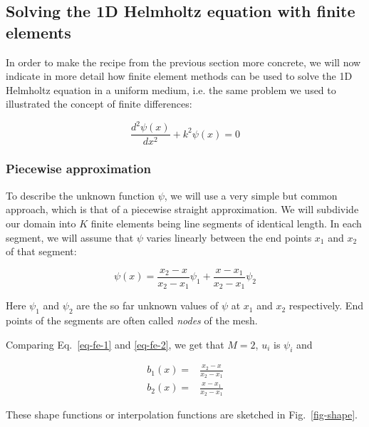 \subsection{Solving the 1D Helmholtz equation with finite elements}

In order to make the recipe from the previous section more concrete, we will now indicate in more detail how finite element methods can be used to solve the 1D Helmholtz equation in a uniform medium, i.e. the same problem we used to illustrated the concept of finite differences:

\begin{equation}
\frac{d^2 \psi (x)}{d x^2} + k^2 \psi(x) = 0 \label{eq-helmholtz-1d-2}
\end{equation} 

\subsubsection{Piecewise approximation}

To describe the unknown function $\psi$, we will use a very simple but common approach, which is that of a piecewise straight approximation. We will subdivide our domain into $K$ finite elements being line segments of identical length. In each segment, we will assume that $\psi$ varies linearly between the end points $x_1$ and $x_2$ of that segment:

\begin{equation}
\psi(x) = \frac{x_2 - x}{x_2 - x_1} \psi_1 + \frac{x - x_1}{x_2 - x_1} \psi_2 \label{eq-fe-2}
\end{equation} 

Here $\psi_1$ and $\psi_2$ are the so far unknown values of $\psi$ at $x_1$ and $x_2$ respectively. End points of the segments are often called \emph{nodes} of the mesh.

Comparing Eq.~\ref{eq-fe-1} and \ref{eq-fe-2}, we get that $M=2$, $u_i$ is $\psi_i$ and

\begin{align}
b_1(x) =& \frac{x_2 - x}{x_2 - x_1} \\
b_2(x) =& \frac{x - x_1}{x_2 - x_1}
\end{align} 

These shape functions or interpolation functions are sketched in Fig.~\ref{fig-shape}.

